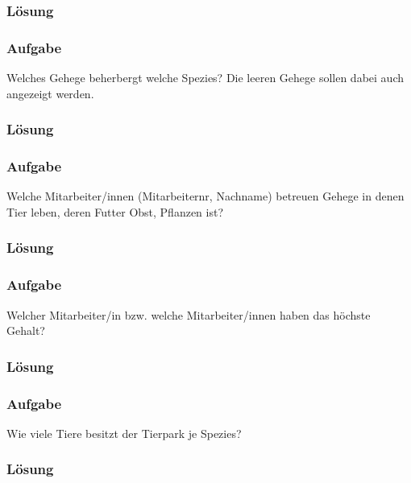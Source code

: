 \label{subsubsec:uebung_01.aufgabe_10b.loesung}
\subsubsection*{Lösung}

\label{subsec:uebung_01.aufgabe_10c}
\subsubsection{Aufgabe}
Welches Gehege beherbergt welche Spezies? Die leeren Gehege sollen dabei auch angezeigt werden.

\label{subsubsec:uebung_01.aufgabe_10c.loesung}
\subsubsection*{Lösung}

\label{subsec:uebung_01.aufgabe_10d}
\subsubsection{Aufgabe}
Welche Mitarbeiter/innen (Mitarbeiternr, Nachname) betreuen Gehege in denen Tier leben, deren Futter Obst, Pflanzen ist?

\label{subsubsec:uebung_01.aufgabe_10d.loesung}
\subsubsection*{Lösung}

\label{subsec:uebung_01.aufgabe_10e}
\subsubsection{Aufgabe}
Welcher Mitarbeiter/in bzw. welche Mitarbeiter/innen haben das höchste Gehalt?

\label{subsubsec:uebung_01.aufgabe_10e.loesung}
\subsubsection*{Lösung}

\label{subsec:uebung_01.aufgabe_10f}
\subsubsection{Aufgabe}
Wie viele Tiere besitzt der Tierpark je Spezies?

\label{subsubsec:uebung_01.aufgabe_10f.loesung}
\subsubsection*{Lösung}
